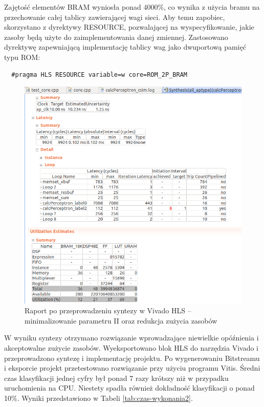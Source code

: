 Zajętość elementów BRAM wyniosła ponad 4000\%, co wynika z użycia bramu na przechowanie całej tablicy zawierającej wagi sieci. Aby temu zapobiec, skorzystano z dyrektywy RESOURCE, pozwalającej na wyspecyfikowanie, jakie zasoby będą użyte do zaimplementowania danej zmiennej. Zastosowano dyrektywę zapewniającą implementację tablicy wag jako dwuportową pamięć typu ROM:
\begin{verbatim}
  #pragma HLS RESOURCE variable=w core=ROM_2P_BRAM
\end{verbatim}


\begin{figure}[!h]
  \centering
  \includegraphics[width=\textwidth]{img/hls-report4.png}
  \caption{Raport po przeprowadzeniu syntezy w Vivado HLS -- minimalizowanie parametru II oraz redukcja zużycia zasobów}
  \label{hls-report4}
\end{figure}

W wyniku syntezy otrzymano rozwiązanie wprowadzające niewielkie opóźnienia i akceptowalne zużycie zasobów. 
Wyeksportowano blok HLS do narzędzia Vivado i przeprowadzono syntezę i implementację projektu. Po wygenerowaniu Bitstreamu i eksporcie projekt przetestowano rozwiązanie przy użyciu programu Vitis. Średni czas klasyfikacji jednej cyfry był ponad 7 razy krótszy niż w przypadku uruchomienia na CPU. Niestety spadła również dokładność klasyfikacji o ponad 10\%. Wyniki przedstawiono w Tabeli \ref{tab:czas-wykonania2}.

